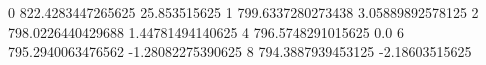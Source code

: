 0 822.4283447265625 25.853515625
1 799.6337280273438 3.05889892578125
2 798.0226440429688 1.44781494140625
4 796.5748291015625 0.0
6 795.2940063476562 -1.28082275390625
8 794.3887939453125 -2.18603515625
